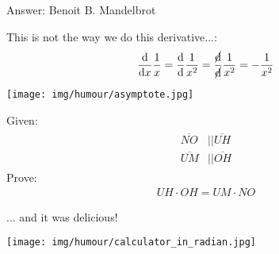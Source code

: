 	Answer: Benoit B. Mandelbrot
	
	\begin{center}\underline{\hspace{5 cm}}\end{center}
	
	This is not the way we do this derivative...:
	\begin{gather*}
		\dfrac{\mathrm{d}}{\mathrm{d}x}\dfrac{1}{x}=\dfrac{\mathrm{d}}{\mathrm{d}}\dfrac{1}{x^2}=\dfrac{\cancel{\mathrm{d}}}{\cancel{\mathrm{d}}}\dfrac{1}{x^2}=-\dfrac{1}{x^2}
	\end{gather*}
	
	\begin{center}\underline{\hspace{5 cm}}\end{center}

	\begin{center}
		\texttt{[image: img/humour/asymptote.jpg]}	
	\end{center}
	
	\begin{center}\underline{\hspace{5 cm}}\end{center}
	Given:
	\begin{gather*}
		\begin{aligned}
		\overline{NO} &|| \overline{UH}\\
		\overline{UM} &|| \overline{OH}
		\end{aligned}
	\end{gather*}
	Prove:
	\begin{gather*}
		UH\cdot OH=UM\cdot NO
	\end{gather*}
	
	\begin{center}\underline{\hspace{5 cm}}\end{center}
	
	\begin{center}
	... and it was delicious!
	\end{center}
	
	\begin{center}
		\texttt{[image: img/humour/calculator\_in\_radian.jpg]}	
	\end{center}
	
	\begin{center}\underline{\hspace{5 cm}}\end{center}	
	
